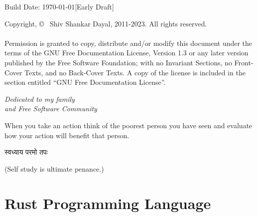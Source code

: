\documentclass[9pt, oneside, b5paper, openright]{memoir}
\title{\sffamily\color{nicecyan}\HUGE{\textbf{Notes on Rust, Data Structures and Algorithms}}}
\author{\vspace*{1cm}\LARGE{Shiv S. Dayal}}
\date{}
\begin{document}
%
\thispagestyle{empty}
\pagestyle{empty}
\vfill
\newpage
\vspace*{5in}
Build Date: \today [{\color{red}Early Draft}]
\vspace*{0.2in}

Copyright, \copyright~ Shiv Shankar Dayal, 2011-2023. All rights reserved.\\\\
Permission is granted to copy, distribute and/or modify this document under the
terms of the GNU Free Documentation License, Version 1.3 or any later version
published by the Free Software Foundation; with no Invariant Sections, no
Front-Cover Texts, and no Back-Cover Texts. A copy of the license is included
in the section entitled ``GNU Free Documentation License''.
\newpage
\vspace*{2in}
\begin{center}
  \Large \it Dedicated to my family\\and Free Software Community
\end{center}
\vspace*{1cm}
\begin{center}
  \large When you take an action think of the poorest person you have seen and evaluate how
  your action will benefit that person.
\end{center}
\begin{center}
\begin{sanskrit}
  स्वध्याय परमो तपः
\end{sanskrit}
(Self study is ultimate penance.)
\end{center}
\newpage
\newpage
\frontmatter
\setcounter{page}{1}
\tableofcontents

\newpage
\pagestyle{fancy}
\mainmatter
{}
\part{Rust Programming Language}
\backmatter

\printindex
\end{document}
